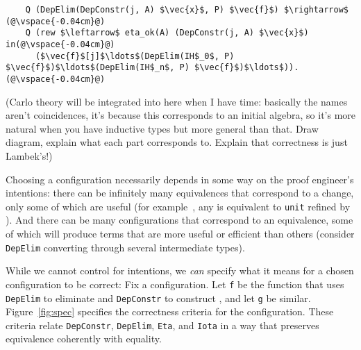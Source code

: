 \begin{figure*}
\begin{minipage}{0.56\textwidth}
\begin{lstlisting}
    Q (DepElim(DepConstr(j, A) $\vec{x}$, P) $\vec{f}$) $\rightarrow$ (@\vspace{-0.04cm}@)
    Q (rew $\leftarrow$ eta_ok(A) (DepConstr(j, A) $\vec{x}$) in(@\vspace{-0.04cm}@)
      ($\vec{f}$[j]$\ldots$(DepElim(IH$_0$, P) $\vec{f}$)$\ldots$(DepElim(IH$_n$, P) $\vec{f}$)$\ldots$)).(@\vspace{-0.04cm}@)
\end{lstlisting}
\end{minipage}
\vspace{-0.2cm}
\caption{Correctness criteria for a configuration to ensure that the transformation
preserves equivalence (left) coherently with equality (right, shown for \Aa; \B is similar). \lstinline{f} and \lstinline{g} are defined in text. $s$, $\vec{f}$, $\vec{x}$, and $\vec{\mathtt{IH}}$ represent
sorts, eliminator cases, constructor arguments, and inductive hypotheses. $\xi$ $(A,$ $P,$ $j)$ is the type 
of \lstinline{DepElim(A, P)} at \lstinline{DepConstr(j, A)} (similarly for \B).} %
\label{fig:spec}
\end{figure*}

(Carlo theory will be integrated into here when I have time: basically the names aren't coincidences, it's because this corresponds
to an initial algebra, so it's more natural when you have inductive types but more general than that.
Draw diagram, explain what each part corresponds to. Explain that correctness is just Lambek's!)

Choosing a configuration necessarily depends in some way on the proof engineer's intentions:
there can be infinitely many equivalences that correspond to a 
change, only some of which are useful (for example~\href{https://github.com/uwplse/pumpkin-pi/blob/v2.0.0/plugin/coq/playground/refine_unit.v}{}, any \Aa is equivalent to \lstinline{unit} refined by \Aa). %
And there can be many configurations that correspond
to an equivalence, some of which will produce terms that are more useful or efficient than others
(consider \lstinline{DepElim} converting through several intermediate types).

While we cannot control for intentions, we \textit{can} specify what it means for a chosen configuration to be correct:
Fix a configuration. Let \lstinline{f} be the function that uses \lstinline{DepElim} to eliminate \Aa and \lstinline{DepConstr} to construct \B,
and let \lstinline{g} be similar.
Figure~\ref{fig:spec} specifies the correctness criteria for the configuration.
These criteria relate \lstinline{DepConstr}, \lstinline{DepElim}, \lstinline{Eta}, and \lstinline{Iota}
in a way that preserves equivalence coherently with equality.

